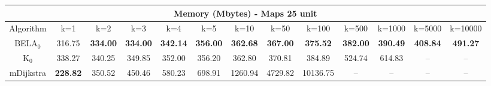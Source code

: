\begin{tabular}{c|cccccccccccc}\toprule
\multicolumn{13}{c}{Memory (Mbytes) - Maps 25 unit}\\ \midrule
Algorithm & k=1 & k=2 & k=3 & k=4 & k=5 & k=10 & k=50 & k=100 & k=500 & k=1000 & k=5000 & k=10000 \\ \midrule
BELA$_0$ & 316.75 & \textbf{334.00} & \textbf{334.00} & \textbf{342.14} & \textbf{356.00} & \textbf{362.68} & \textbf{367.00} & \textbf{375.52} & \textbf{382.00} & \textbf{390.49} & \textbf{408.84} & \textbf{491.27} \\
K$_0$ & 338.27 & 340.25 & 349.85 & 352.00 & 356.20 & 362.80 & 370.81 & 384.89 & 524.74 & 614.83 & -- & -- \\
mDijkstra & \textbf{228.82} & 350.52 & 450.46 & 580.23 & 698.91 & 1260.94 & 4729.82 & 10136.75 & -- & -- & -- & -- \\ \bottomrule 
\end{tabular}

